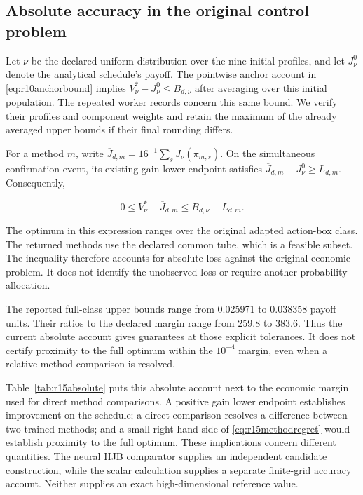 \subsection{Absolute accuracy in the original control problem}

\label{sec:r15absolute}

Let $\nu$ be the declared uniform distribution over the nine initial profiles, and let $J_\nu^0$ denote the analytical schedule's payoff. The pointwise anchor account in \eqref{eq:r10anchorbound} implies $V_\nu^*-J_\nu^0\le B_{d,\nu}$ after averaging over this initial population. The repeated worker records concern this same bound. We verify their profiles and component weights and retain the maximum of the already averaged upper bounds if their final rounding differs.

For a method $m$, write $\overline J_{d,m}=16^{-1}\sum_s J_\nu(\pi_{m,s})$. On the simultaneous confirmation event, its existing gain lower endpoint satisfies $\overline J_{d,m}-J_\nu^0\ge L_{d,m}$. Consequently,

\begin{equation}\label{eq:r15methodregret}
0\le V_\nu^*-\overline J_{d,m}\le B_{d,\nu}-L_{d,m}.
\end{equation}

The optimum in this expression ranges over the original adapted action-box class. The returned methods use the declared common tube, which is a feasible subset. The inequality therefore accounts for absolute loss against the original economic problem. It does not identify the unobserved loss or require another probability allocation.



The reported full-class upper bounds range from 0.025971 to 0.038358 payoff units. Their ratios to the declared margin range from 259.8 to 383.6. Thus the current absolute account gives guarantees at those explicit tolerances. It does not certify proximity to the full optimum within the $10^{-4}$ margin, even when a relative method comparison is resolved.

Table~\ref{tab:r15absolute} puts this absolute account next to the economic margin used for direct method comparisons. A positive gain lower endpoint establishes improvement on the schedule; a direct comparison resolves a difference between two trained methods; and a small right-hand side of \eqref{eq:r15methodregret} would establish proximity to the full optimum. These implications concern different quantities. The neural HJB comparator supplies an independent candidate construction, while the scalar calculation supplies a separate finite-grid accuracy account. Neither supplies an exact high-dimensional reference value.
